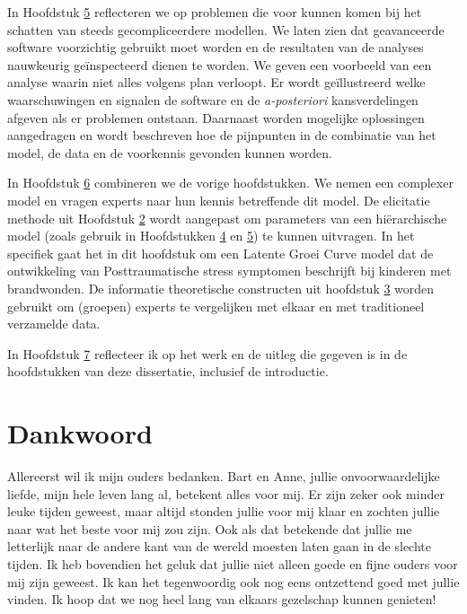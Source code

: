 \documentclass[openright,titlepage,12pt,a4paper]{book}
\begin{document}
In Hoofdstuk \protect\hyperlink{Burns}{5} reflecteren we op problemen die voor kunnen komen bij het schatten van steeds gecompliceerdere modellen. We laten zien dat geavanceerde software voorzichtig gebruikt moet worden en de resultaten van de analyses nauwkeurig geïnspecteerd dienen te worden. We geven een voorbeeld van een analyse waarin niet alles volgens plan verloopt. Er wordt geïllustreerd welke waarschuwingen en signalen de software en de \emph{a-posteriori} kansverdelingen afgeven als er problemen ontstaan. Daarnaast worden mogelijke oplossingen aangedragen en wordt beschreven hoe de pijnpunten in de combinatie van het model, de data en de voorkennis gevonden kunnen worden.

In Hoofdstuk \protect\hyperlink{elicitlgm}{6} combineren we de vorige hoofdstukken. We nemen een complexer model en vragen experts naar hun kennis betreffende dit model. De elicitatie methode uit Hoofdstuk \protect\hyperlink{fivestep}{2} wordt aangepast om parameters van een hiërarchische model (zoals gebruik in Hoofdstukken \protect\hyperlink{Hierarchical}{4} en \protect\hyperlink{Burns}{5}) te kunnen uitvragen. In het specifiek gaat het in dit hoofdstuk om een Latente Groei Curve model dat de ontwikkeling van Posttraumatische stress symptomen beschrijft bij kinderen met brandwonden. De informatie theoretische constructen uit hoofdstuk \protect\hyperlink{DAC1}{3} worden gebruikt om (groepen) experts te vergelijken met elkaar en met traditioneel verzamelde data.

In Hoofdstuk \protect\hyperlink{thesisdiscussion}{7} reflecteer ik op het werk en de uitleg die gegeven is in de hoofdstukken van deze dissertatie, inclusief de introductie.

\hypertarget{dankwoord}{%
\chapter*{Dankwoord}\label{dankwoord}}

%

\thispagestyle{empty}

Allereerst wil ik mijn ouders bedanken. Bart en Anne, jullie onvoorwaardelijke liefde, mijn hele leven lang al, betekent alles voor mij. Er zijn zeker ook minder leuke tijden geweest, maar altijd stonden jullie voor mij klaar en zochten jullie naar wat het beste voor mij zou zijn. Ook als dat betekende dat jullie me letterlijk naar de andere kant van de wereld moesten laten gaan in de slechte tijden. Ik heb bovendien het geluk dat jullie niet alleen goede en fijne ouders voor mij zijn geweest. Ik kan het tegenwoordig ook nog eens ontzettend goed met jullie vinden. Ik hoop dat we nog heel lang van elkaars gezelschap kunnen genieten!
\end{document}
